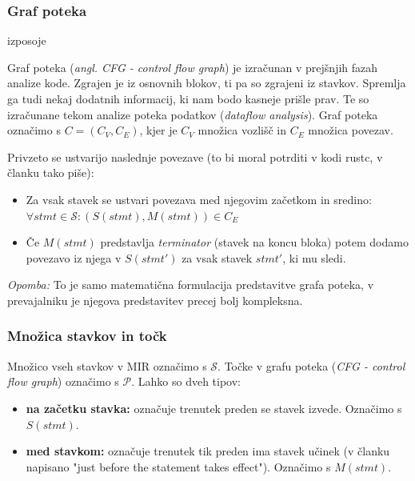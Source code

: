 \documentclass{article}
\begin{document}
\subsubsection{Graf poteka}izposoje

Graf poteka (\textit{angl. CFG - control flow graph}) je izračunan v prejšnjih fazah analize kode.
Zgrajen je iz osnovnih blokov, ti pa so zgrajeni iz stavkov. Spremlja ga tudi nekaj dodatnih informacij,
ki nam bodo kasneje prišle prav. Te so izračunane tekom analize poteka podatkov
(\textit{dataflow analysis})\cite{MIRDataflowRust}. Graf poteka označimo s $C = (C_{V}, C_{E})$, kjer
je $C_{V}$ množica vozlišč in $C_{E}$ množica povezav.


Privzeto se ustvarijo naslednje povezave (to bi moral potrditi v kodi rustc, v članku tako piše):

\begin{itemize}
	\item Za vsak stavek se ustvari povezava med njegovim začetkom in sredino:
	      $\forall stmt \in \mathcal{S}: (S(stmt), M(stmt)) \in C_{E}$
	\item Če $M(stmt)$ predstavlja \textit{terminator} (stavek na koncu bloka) potem dodamo povezavo iz njega v $S(stmt')$
	      za vsak stavek $stmt'$, ki mu sledi.
\end{itemize}

\textit{Opomba:} To je samo matematična formulacija predstavitve grafa poteka, v prevajalniku
je njegova predstavitev precej bolj kompleksna.

\subsubsection{Množica stavkov in točk}

Množico vseh stavkov v MIR označimo s $\mathcal{S}$. Točke v grafu poteka (\textit{CFG - control flow graph})
označimo s $\mathcal{P}$. Lahko so dveh tipov:
\begin{itemize}
	\item \textbf{na začetku stavka:} označuje trenutek preden se stavek izvede. Označimo s $S(stmt)$.
	\item \textbf{med stavkom:} označuje trenutek tik preden ima stavek učinek (v članku napisano "just before the statement takes effect").
	      Označimo s $M(stmt)$.
\end{itemize}
\end{document}
